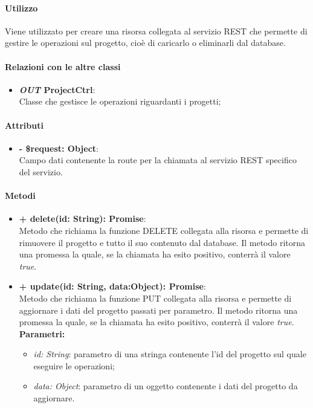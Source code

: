 	\paragraph{Utilizzo}
	Viene utilizzato per creare una risorsa collegata al servizio REST che permette di gestire le operazioni sul progetto, cioè di caricarlo o eliminarli dal database.
	
	\paragraph{Relazioni con le altre classi}
	\begin{itemize}
		\item \textbf{\textit{OUT} ProjectCtrl}:\\
			Classe che gestisce le operazioni riguardanti i progetti;
	\end{itemize}
	
	\paragraph{Attributi}
	\begin{itemize}
		\item \textbf{- \$request: Object}:\\
		Campo dati contenente la route per la chiamata al servizio REST specifico del servizio.
	\end{itemize}	
	
	\paragraph{Metodi}
	\begin{itemize}
		\item \textbf{+ delete(id: String): Promise}:\\
			Metodo che richiama la funzione DELETE collegata alla risorsa e permette di rimuovere il progetto e tutto il suo contenuto dal database. Il metodo ritorna una promessa la quale, se la chiamata ha esito positivo, conterrà il valore \textit{true}.\\
		\item \textbf{+ update(id: String, data:Object): Promise}:\\
			Metodo che richiama la funzione PUT collegata alla risorsa e permette di aggiornare i dati del progetto passati per parametro. Il metodo ritorna una promessa la quale, se la chiamata ha esito positivo, conterrà il valore \textit{true}.\\
		\textbf{Parametri:}\\
		\begin{itemize}
			\item \textit{id: String}: parametro di una stringa contenente l'id del progetto sul quale eseguire le operazioni;
			\item \textit{data: Object}: parametro di un oggetto contenente i dati del progetto da aggiornare.
		\end{itemize}
	\end{itemize}



